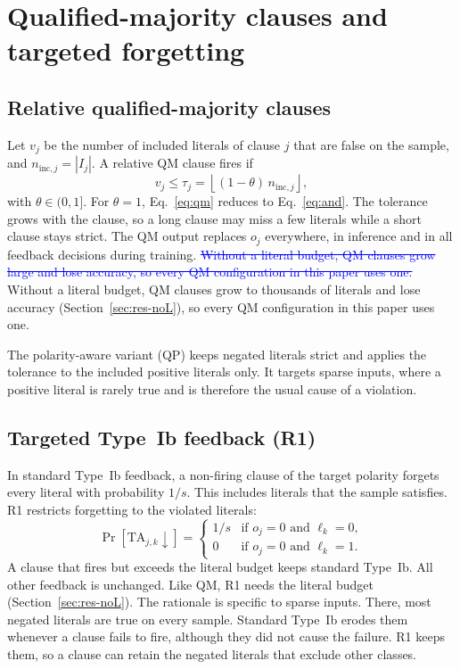 \documentclass[preprint,12pt,times]{elsarticle}
\newcommand{\add}[1]{{\color{blue}#1}}
\newcommand{\del}[1]{\textcolor{blue}{\sout{#1}}}
\newcommand{\ninc}{n_{\mathrm{inc},j}}
\begin{document}
\section{Qualified-majority clauses and targeted forgetting}
\label{sec:method}

\subsection{Relative qualified-majority clauses}
Let $v_j$ be the number of included literals of clause $j$ that are false on the sample, and $\ninc = |I_j|$.
A relative QM clause fires if
\begin{equation}
v_j \le \tau_j = \left\lfloor (1-\theta)\,\ninc \right\rfloor ,
\label{eq:qm}
\end{equation}
with $\theta \in (0,1]$.
For $\theta = 1$, Eq.~\eqref{eq:qm} reduces to Eq.~\eqref{eq:and}.
The tolerance grows with the clause, so a long clause may miss a few literals while a short clause stays strict.
The QM output replaces $o_j$ everywhere, in inference and in all feedback decisions during training.
\del{Without a literal budget, QM clauses grow large and lose accuracy, so every QM configuration in this paper uses one.}
\add{Without a literal budget, QM clauses grow to thousands of literals and lose accuracy (Section~\ref{sec:res-noL}), so every QM configuration in this paper uses one.}

The polarity-aware variant (QP) keeps negated literals strict and applies the tolerance to the included positive literals only.
It targets sparse inputs, where a positive literal is rarely true and is therefore the usual cause of a violation.

\subsection{Targeted Type~Ib feedback (R1)}
In standard Type~Ib feedback, a non-firing clause of the target polarity forgets every literal with probability $1/s$.
This includes literals that the sample satisfies.
R1 restricts forgetting to the violated literals:
\begin{equation}
\Pr\left[\mathrm{TA}_{j,k} \downarrow\right] =
\begin{cases}
1/s & \text{if } o_j = 0 \text{ and } \ell_k = 0,\\
0 & \text{if } o_j = 0 \text{ and } \ell_k = 1.
\end{cases}
\label{eq:r1}
\end{equation}
A clause that fires but exceeds the literal budget keeps standard Type~Ib.
All other feedback is unchanged.
\add{Like QM, R1 needs the literal budget (Section~\ref{sec:res-noL}).}
The rationale is specific to sparse inputs.
There, most negated literals are true on every sample.
Standard Type~Ib erodes them whenever a clause fails to fire, although they did not cause the failure.
R1 keeps them, so a clause can retain the negated literals that exclude other classes.
\end{document}
